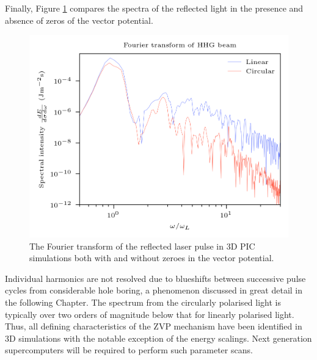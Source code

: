 Finally, Figure \ref{fig:zvphhgbeamfourier} compares the spectra of the reflected light in the presence and absence of zeros of the vector potential.
\begin{figure}
	\centering
	\includegraphics[width=0.7\linewidth]{figures/zvp/zvp_hhg_beam_fourier}
	\caption[The Fourier transform of the reflected laser pulse in 3D PIC simulations.]{The Fourier transform of the reflected laser pulse in 3D PIC simulations both with and without zeroes in the vector potential.}
	\label{fig:zvphhgbeamfourier}
\end{figure}
Individual harmonics are not resolved due to blueshifts between successive pulse cycles from considerable hole boring, a phenomenon discussed in great detail in the following Chapter. The spectrum from the circularly polarised light is typically over two orders of magnitude below that for linearly polarised light. Thus, all defining characteristics of the ZVP mechanism have been identified in 3D simulations with the notable exception of the energy scalings. Next generation supercomputers will be required to perform such parameter scans.

